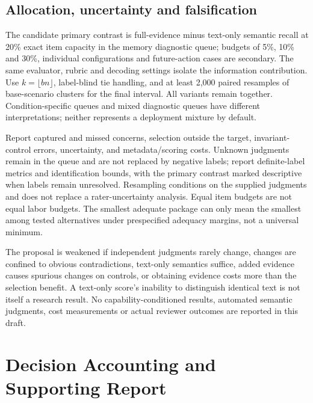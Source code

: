 \documentclass[manuscript,screen,review,anonymous]{acmart}
\begin{document}
\subsection{Allocation, uncertainty and falsification}
The candidate primary contrast is full-evidence minus text-only semantic recall at 20\% exact item capacity in the memory diagnostic queue; budgets of 5\%, 10\% and 30\%, individual configurations and future-action cases are secondary. The same evaluator, rubric and decoding settings isolate the information contribution. Use $k=\lfloor bn\rfloor$, label-blind tie handling, and at least 2,000 paired resamples of base-scenario clusters for the final interval. All variants remain together. Condition-specific queues and mixed diagnostic queues have different interpretations; neither represents a deployment mixture by default.

Report captured and missed concerns, selection outside the target, invariant-control errors, uncertainty, and metadata/scoring costs. Unknown judgments remain in the queue and are not replaced by negative labels; report definite-label metrics and identification bounds, with the primary contrast marked descriptive when labels remain unresolved. Resampling conditions on the supplied judgments and does not replace a rater-uncertainty analysis. Equal item budgets are not equal labor budgets. The smallest adequate package can only mean the smallest among tested alternatives under prespecified adequacy margins, not a universal minimum.

The proposal is weakened if independent judgments rarely change, changes are confined to obvious contradictions, text-only semantics suffice, added evidence causes spurious changes on controls, or obtaining evidence costs more than the selection benefit. A text-only score's inability to distinguish identical text is not itself a research result. No capability-conditioned results, automated semantic judgments, cost measurements or actual reviewer outcomes are reported in this draft.

\section{Decision Accounting and Supporting Report}
\end{document}
